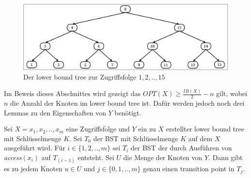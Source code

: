 \documentclass[a4paper,12pt]{article}
\begin{document}
\begin{figure}[h]
	\centering
	\includegraphics[width=1\textwidth]{"Medien/Tango/lowerBoundTree"}
	\caption{Der lower bound tree zur Zugriffsfolge $1 ,2, .., 15$  }
	\label{fig:demlowerBoundTree}
\end{figure}

\noindent Im Beweis dieses Abschnittes wird gezeigt das $\mathit{OPT}\left(X\right) \geq \frac{\mathit{IB}\left(X\right)}{2} - n$ gilt, wobei $n$ die Anzahl der Knoten im lower bound tree ist. Dafür werden jedoch noch drei Lemmas zu den Eigenschaften von $Y$ benötigt. 

\begin{Lemma} \label{demaineLemma1}
	Sei $X = x_1,x_2,..,x_m$ eine Zugriffsfolge und $Y$ ein zu $X$ erstellter lower bound tree mit Schlüsselmenge $K$. Sei $T_0$ der BST mit Schlüsselmenge $K$ auf dem $X$ ausgeführt wird. Für $i \in \{1,2,..,m\}$ sei $T_i$ der BST der durch Ausführen von \textit{access}$\left(x_i\right)$ auf $T_{\left(i-1\right)}$ entsteht. Sei $U$ die Menge der Knoten von $Y$. Dann gibt es zu jedem Knoten $u \in U$ und $j \in \{0,1,..,m\}$ genau einen transition point in $T_j$. 	
\end{Lemma}
\end{document}

